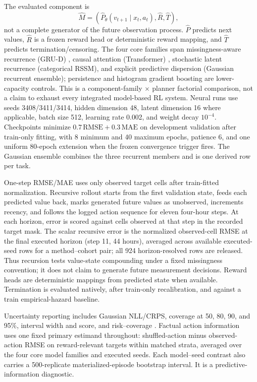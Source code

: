 \documentclass[sigconf,review]{acmart}
\begin{document}
The evaluated component is
\begin{equation}
\widehat M=(\widehat P_\theta(v_{t+1}\mid x_t,a_t),\widehat R,\widehat T),
\end{equation}
not a complete generator of the future observation process. $\widehat P$ predicts next values, $\widehat R$ is a frozen reward head or deterministic reward mapping, and $\widehat T$ predicts termination/censoring. The four core families span missingness-aware recurrence (GRU-D) \cite{che2018recurrent}, causal attention (Transformer) \cite{vaswani2017attention}, stochastic latent recurrence (categorical RSSM), and explicit predictive dispersion (Gaussian recurrent ensemble); persistence and histogram gradient boosting are lower-capacity controls. This is a component-family $\times$ planner factorial comparison, not a claim to exhaust every integrated model-based RL system. Neural runs use seeds 3408/3411/3414, hidden dimension 48, latent dimension 16 where applicable, batch size 512, learning rate 0.002, and weight decay $10^{-4}$. Checkpoints minimize $0.7\,\mathrm{RMSE}+0.3\,\mathrm{MAE}$ on development validation after train-only fitting, with 8 minimum and 40 maximum epochs, patience 6, and one uniform 80-epoch extension when the frozen convergence trigger fires. The Gaussian ensemble combines the three recurrent members and is one derived row per task.

One-step RMSE/MAE uses only observed target cells after train-fitted normalization. Recursive rollout starts from the first validation state, feeds each predicted value back, marks generated future values as unobserved, increments recency, and follows the logged action sequence for eleven four-hour steps. At each horizon, error is scored against cells observed at that step in the recorded target mask. The scalar recursive error is the normalized observed-cell RMSE at the final executed horizon (step 11, 44 hours), averaged across available executed-seed rows for a method--cohort pair; all 924 horizon-resolved rows are released. Thus recursion tests value-state compounding under a fixed missingness convention; it does not claim to generate future measurement decisions. Reward heads are deterministic mappings from predicted state when available. Termination is evaluated natively, after train-only recalibration, and against a train empirical-hazard baseline.

Uncertainty reporting includes Gaussian NLL/CRPS, coverage at 50, 80, 90, and 95\%, interval width and score, and risk--coverage \cite{guo2017calibration,kuleshov2018accurate}. Factual action information uses one fixed primary estimand throughout: shuffled-action minus observed-action RMSE on reward-relevant targets within matched strata, averaged over the four core model families and executed seeds. Each model--seed contrast also carries a 500-replicate materialized-episode bootstrap interval. It is a predictive-information diagnostic.
\end{document}
